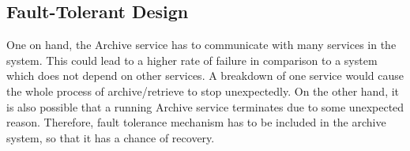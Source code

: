         \subsection{Fault-Tolerant Design}   
        One on hand, the Archive service has to communicate with many services in the system. This could lead to a higher rate of failure 
        in comparison to a system which does not depend on other services. A breakdown 
        of one service would cause the whole process of archive/retrieve to stop unexpectedly. On the other hand, it is also possible that a running Archive service terminates
        due to some unexpected reason. Therefore, fault tolerance mechanism has to be included in the archive system, so that it has a chance of 
        recovery. 
